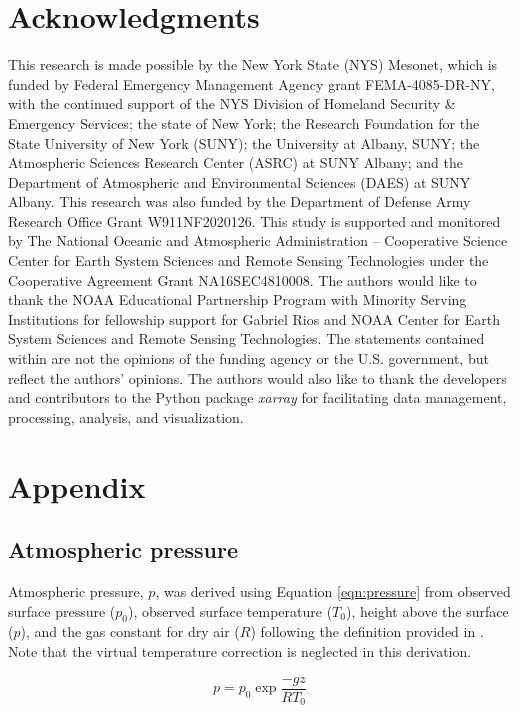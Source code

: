 \section*{Acknowledgments}
This research is made possible by the New York State (NYS) Mesonet, which is funded by Federal Emergency Management Agency grant FEMA-4085-DR-NY, with the continued support of the NYS Division of Homeland Security \& Emergency Services; the state of New York; the Research Foundation for the State University of New York (SUNY); the University at Albany, SUNY; the Atmospheric Sciences Research Center (ASRC) at SUNY Albany; and the Department of Atmospheric and Environmental Sciences (DAES) at SUNY Albany. This research was also funded by the Department of Defense Army Research Office Grant W911NF2020126. This study is supported and monitored by The National Oceanic and Atmospheric Administration – Cooperative Science Center for Earth System Sciences and Remote Sensing Technologies under the Cooperative Agreement Grant NA16SEC4810008. The authors would like to thank the NOAA Educational Partnership Program with Minority Serving Institutions for fellowship support for Gabriel Rios and NOAA Center for Earth System Sciences and Remote Sensing Technologies. The statements contained within are not the opinions of the funding agency or the U.S. government, but reflect the authors' opinions. The authors would also like to thank the developers and contributors to the Python package \textit{xarray} \citep{hoyer2017} for facilitating data management, processing, analysis, and visualization.

\section*{Appendix} \label{section:appendix}

\subsection*{Atmospheric pressure}

Atmospheric pressure, $p$, was derived using Equation \ref{eqn:pressure} from observed surface pressure ($p_0$), observed surface temperature ($T_0$), height above the surface ($p$), and the gas constant for dry air ($R$) following the definition provided in \citet{wallace2006}. Note that the virtual temperature correction is neglected in this derivation.

\begin{equation*}\label{eqn:pressure}
	p = p_0 \exp{\frac{-g z}{R T_0}}
\end{equation*}

